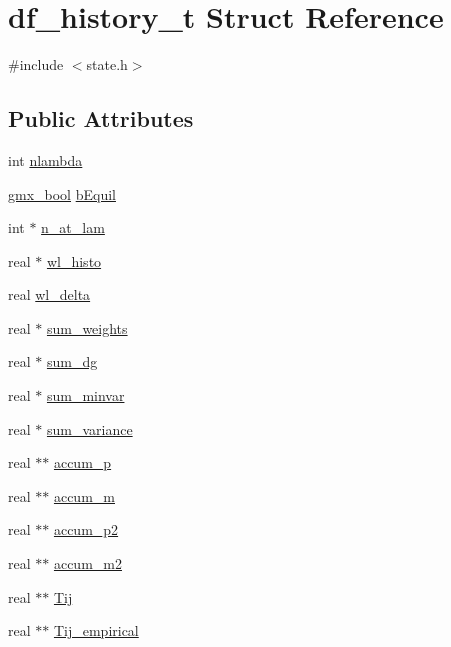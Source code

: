 \hypertarget{structdf__history__t}{\section{df\-\_\-history\-\_\-t \-Struct \-Reference}
\label{structdf__history__t}
}


{\ttfamily \#include $<$state.\-h$>$}

\subsection*{\-Public \-Attributes}
\begin{DoxyCompactItemize}
\item 
int \hyperlink{structdf__history__t_a4eb78866873d889cb92ac4c8ae4a9fc5}{nlambda}
\item 
\hyperlink{include_2types_2simple_8h_a8fddad319f226e856400d190198d5151}{gmx\-\_\-bool} \hyperlink{structdf__history__t_a7b57d8cbac91cb99c569276d89bb89cf}{b\-Equil}
\item 
int $\ast$ \hyperlink{structdf__history__t_a54098748bcef7582e69f0f562b14ecf3}{n\-\_\-at\-\_\-lam}
\item 
real $\ast$ \hyperlink{structdf__history__t_a77a72d9e45ef2ff711a10e1675ce563d}{wl\-\_\-histo}
\item 
real \hyperlink{structdf__history__t_ac90f47b13716d3b369111abdf03683d4}{wl\-\_\-delta}
\item 
real $\ast$ \hyperlink{structdf__history__t_a45cdb272f6c0ecac43c61c3aa3255e80}{sum\-\_\-weights}
\item 
real $\ast$ \hyperlink{structdf__history__t_a6d136e8104d472efaca0d5a04afeb34c}{sum\-\_\-dg}
\item 
real $\ast$ \hyperlink{structdf__history__t_a534a3df2769accec12bad80855f26386}{sum\-\_\-minvar}
\item 
real $\ast$ \hyperlink{structdf__history__t_afbd6a11a1abe22f243417b88520c7860}{sum\-\_\-variance}
\item 
real $\ast$$\ast$ \hyperlink{structdf__history__t_ac9c1f740b756212eb5af86de87c43d6c}{accum\-\_\-p}
\item 
real $\ast$$\ast$ \hyperlink{structdf__history__t_a86e57854a66d0f81bdb29e9cec68eccf}{accum\-\_\-m}
\item 
real $\ast$$\ast$ \hyperlink{structdf__history__t_a3b816477f280b6b90741a7827c5d6a25}{accum\-\_\-p2}
\item 
real $\ast$$\ast$ \hyperlink{structdf__history__t_a06296d0a0581fe4688a263ae60ca585a}{accum\-\_\-m2}
\item 
real $\ast$$\ast$ \hyperlink{structdf__history__t_ad2324c9d3cc846308921afb723eca028}{\-Tij}
\item 
real $\ast$$\ast$ \hyperlink{structdf__history__t_ab0ff31b1e50e2c36742dc2391a0820ae}{\-Tij\-\_\-empirical}
\end{DoxyCompactItemize}


